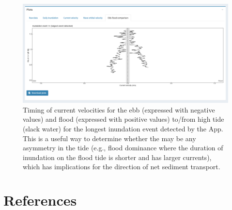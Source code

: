 \documentclass[
  letterpaper,
  DIV=11,
  numbers=noendperiod]{scrreprt}
\newlength{\cslhangindent}
\newlength{\cslentryspacingunit} %
\newenvironment{CSLReferences}[2] %
 {%
  \setlength{\parindent}{0pt}
  \ifodd #1
  \let\oldpar\par
  \def\par{\hangindent=\cslhangindent\oldpar}
  \fi
  \setlength{\parskip}{#2\cslentryspacingunit}
 }%
 {}
\begin{document}
\begin{figure}

{\centering \includegraphics[width=1\textwidth,height=\textheight]{chapters/figs/EbbFloodData.png}

}

\caption{Timing of current velocities for the ebb (expressed with
negative values) and flood (expressed with positive values) to/from high
tide (slack water) for the longest inundation event detected by the App.
This is a useful way to determine whether the may be any asymmetry in
the tide (e.g., flood dominance where the duration of inundation on the
flood tide is shorter and has larger currents), which has implications
for the direction of net sediment transport.}

\end{figure}


\hypertarget{references}{%
\chapter*{References}\label{references}}


\hypertarget{refs}{}
\begin{CSLReferences}{0}{0}
\end{CSLReferences}
\end{document}
